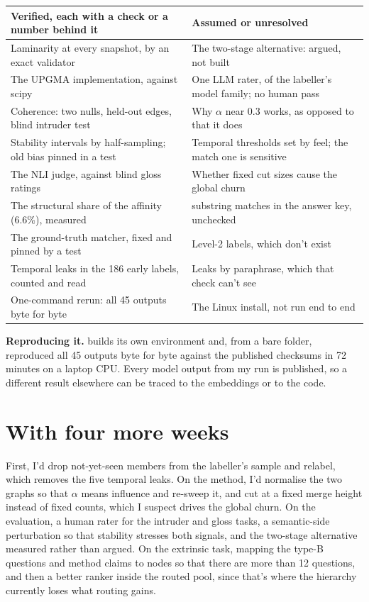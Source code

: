 \documentclass[10pt,a4paper]{article}
\newcommand{\code}[1]{\texttt{\small\detokenize{#1}}}
\newcommand{\para}[1]{\textbf{#1}\hspace{0.4em}}
\begin{document}
\begin{table}[h]
\centering\small
\begin{tabularx}{\linewidth}{@{}>{\raggedright\arraybackslash}X >{\raggedright\arraybackslash}X@{}}
\toprule
\textbf{Verified}, each with a check or a number behind it & \textbf{Assumed or unresolved} \\
\midrule
Laminarity at every snapshot, by an exact validator & The two-stage alternative: argued, not built \\
The UPGMA implementation, against scipy & One LLM rater, of the labeller's model family; no human pass \\
Coherence: two nulls, held-out edges, blind intruder test & Why $\alpha$ near 0.3 works, as opposed to that it does \\
Stability intervals by half-sampling; old bias pinned in a test & Temporal thresholds set by feel; the match one is sensitive \\
The NLI judge, against blind gloss ratings & Whether fixed cut sizes cause the global churn \\
The structural share of the affinity (6.6\%), measured & 7 substring matches in the answer key, unchecked \\
The ground-truth matcher, fixed and pinned by a test & Level-2 labels, which don't exist \\
Temporal leaks in the 186 early labels, counted and read & Leaks by paraphrase, which that check can't see \\
One-command rerun: all 45 outputs byte for byte & The Linux install, not run end to end \\
\bottomrule
\end{tabularx}
\end{table}

\para{Reproducing it.} \code{py -3.11 scripts/reproduce_all.py} builds its own environment and, from a bare
folder, reproduced all 45 outputs byte for byte against the published checksums in 72 minutes on a laptop
CPU. Every model output from my run is published, so a different result elsewhere can be traced to the
embeddings or to the code.

\section{With four more weeks}

First, I'd drop not-yet-seen members from the labeller's sample and relabel, which removes the five
temporal leaks. On the method, I'd normalise the two graphs so that $\alpha$ means influence and re-sweep it, and cut at a
fixed merge height instead of fixed counts, which I suspect drives the global churn. On the evaluation, a
human rater for the intruder and gloss tasks, a semantic-side perturbation so that stability stresses both
signals, and the two-stage alternative measured rather than argued. On the extrinsic task, mapping the
type-B questions and method claims to nodes so that there are more than 12 questions, and then a better
ranker inside the routed pool, since that's where the hierarchy currently loses what routing gains.
\end{document}
